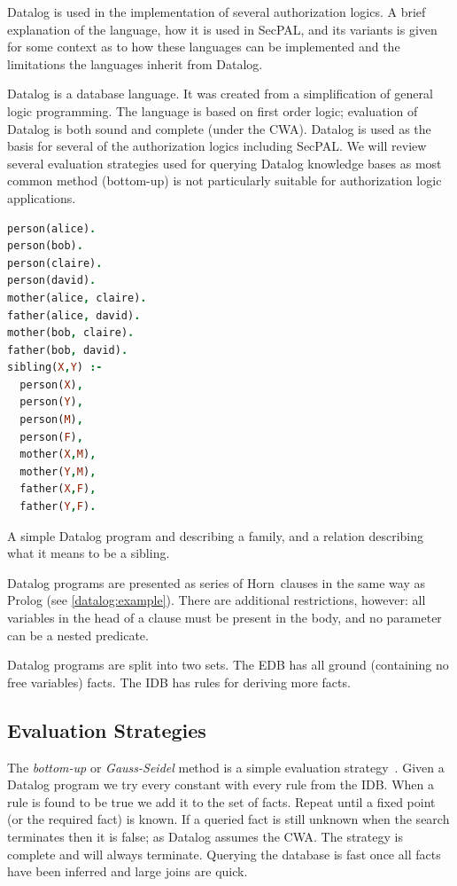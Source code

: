 \documentclass[a4paper,sfsidenotes]{%
  scrartcl%
}
\begin{document}
Datalog is used in the implementation of several authorization logics.  A brief
explanation of the language, how it is used in SecPAL, and its variants is given
for some context as to how these languages can be implemented and the
limitations the languages inherit from Datalog.

Datalog is a database language. It was created from a simplification of general
logic programming.  The language is based on first order logic; evaluation of
Datalog is both sound and complete (under the \ac{CWA}).  Datalog is used as the
basis for several of the authorization logics including SecPAL. We will review
several evaluation strategies used for querying Datalog knowledge bases as most
common method (bottom-up) is not particularly suitable for authorization logic
applications.

\begin{marginfigure}
  \label{datalog:example}
  \begin{lstlisting}[language=Prolog]
person(alice).  
person(bob).
person(claire). 
person(david).
mother(alice, claire).
father(alice, david).
mother(bob, claire).
father(bob, david).
sibling(X,Y) :- 
  person(X),
  person(Y),
  person(M),   
  person(F),
  mother(X,M),
  mother(Y,M), 
  father(X,F), 
  father(Y,F).
  \end{lstlisting}
  \caption[Datalog example.]{A simple Datalog program and describing a family, and a relation
  describing what it means to be a sibling.}
\end{marginfigure}

Datalog programs are presented as series of Horn~clauses in the
same way as Prolog (see \autoref{datalog:example}).  There are
additional restrictions, however: all variables in the head of a clause
must be present in the body, and no parameter can be a nested predicate.

Datalog programs are split into two sets.
The \ac{EDB} has all ground (containing no free variables) facts.
The \ac{IDB} has rules for deriving more facts.

\subsection{Evaluation Strategies}

The \emph{bottom-up} or \emph{Gauss-Seidel} method is a simple evaluation
strategy~\cite{Ceri:1989ff}.  Given a Datalog program we try every constant with
every rule from the \ac{IDB}.  When a rule is found to be true we add it to the set
of facts.  Repeat until a fixed point (or the required fact) is known.  If a
queried fact is still unknown when the search terminates then it is false; as Datalog assumes
the \ac{CWA}.  The strategy is complete and will always
terminate. Querying the database is fast once all facts have been inferred 
and large joins are quick.
\end{document}
